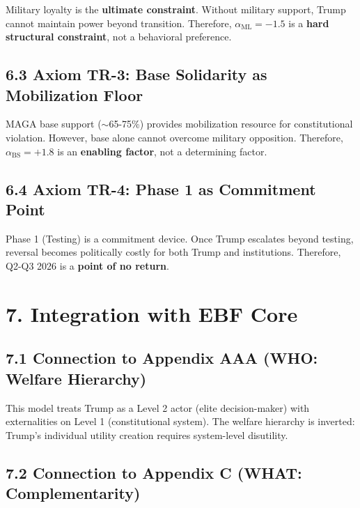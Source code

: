 \documentclass[11pt]{article}
\begin{document}
\begin{fancybox}
Military loyalty is the \textbf{ultimate constraint}. Without military support, Trump cannot maintain power beyond transition. Therefore, $\alpha_{\text{ML}} = -1.5$ is a \textbf{hard structural constraint}, not a behavioral preference.
\end{fancybox}

\subsection{6.3 Axiom TR-3: Base Solidarity as Mobilization Floor}

\begin{fancybox}
MAGA base support ($\sim$65-75\%) provides mobilization resource for constitutional violation. However, base alone cannot overcome military opposition. Therefore, $\alpha_{\text{BS}} = +1.8$ is an \textbf{enabling factor}, not a determining factor.
\end{fancybox}

\subsection{6.4 Axiom TR-4: Phase 1 as Commitment Point}

\begin{fancybox}
Phase 1 (Testing) is a commitment device. Once Trump escalates beyond testing, reversal becomes politically costly for both Trump and institutions. Therefore, Q2-Q3 2026 is a \textbf{point of no return}.
\end{fancybox}

\section{7. Integration with EBF Core}

\subsection{7.1 Connection to Appendix AAA (WHO: Welfare Hierarchy)}

This model treats Trump as a Level 2 actor (elite decision-maker) with externalities on Level 1 (constitutional system). The welfare hierarchy is inverted: Trump's individual utility creation requires system-level disutility.

\subsection{7.2 Connection to Appendix C (WHAT: Complementarity)}
\end{document}
